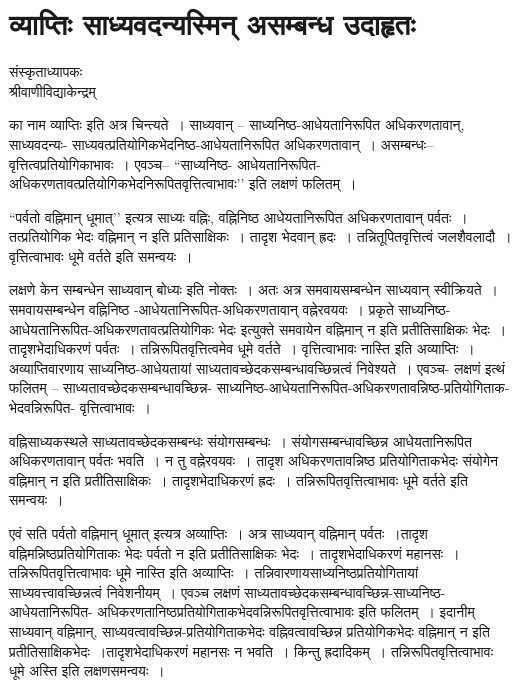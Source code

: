 {\fontsize{15}{17}\selectfont
\presetvalues
\chapter{व्याप्तिः साध्यवदन्यस्मिन्  असम्बन्ध उदाहृतः}

\begin{center}
\smallskip

संस्कृताध्यापकः\\
श्रीवाणीविद्याकेन्द्रम्
\addrule
\end{center}

का नाम व्याप्तिः इति अत्र चिन्त्यते~। साध्यवान् – साध्यनिष्ठ-आधेयतानिरूपित अधिकरणतावान्, साध्यवदन्यः- साध्यवत्प्रतियोगिकभेदनिष्ठ-आधेयतानिरूपित अधिकरणतावान्~। असम्बन्धः--वृत्तित्वप्रतियोगिकाभावः~। एवञ्च– “साध्यनिष्ठ- आधेयतानिरूपित-अधिकरणतावत्प्रतियोगिकभेदनिरूपितवृत्तित्वाभावः’’ इति लक्षणं फलितम्~। 

“पर्वतो वह्निमान् धूमात्’’ इत्यत्र साध्यः वह्निः, वह्निनिष्ठ आधेयतानिरूपित अधिकरणतावान् पर्वतः~। तत्प्रतियोगिक भेदः वह्निमान् न इति प्रतिसाक्षिकः~। तादृश भेदवान् ह्रदः~। तन्नितूपितवृत्तित्वं जलशैवलादौ~। वृत्तित्वाभावः धूमे वर्तते इति समन्वयः~। 

लक्षणे केन सम्बन्धेन साध्यवान् बोध्यः इति नोक्तः~। अतः अत्र समवायसम्बन्धेन साध्यवान् स्वीक्रियते~। समवायसम्बन्धेन वह्निनिष्ठ -आधेयतानिरूपित-अधिकरणतावान् वह्नेरवयवः~। प्रकृते साध्यनिष्ठ-आधेयतानिरूपित-अधिकरणतावत्प्रतियोगिकः भेदः इत्युक्ते समवायेन वह्निमान् न इति प्रतीतिसाक्षिकः भेदः~। तादृशभेदाधिकरणं पर्वतः~। तन्निरूपितवृत्तित्वमेव धूमे वर्तते~। वृत्तित्वाभावः नास्ति इति अव्याप्तिः~। अव्याप्तिवारणाय साध्यनिष्ठ-आधेयतायां साध्यतावच्छेदकसम्बन्धावच्छिन्नत्वं निवेश्यते~। एवञ्च- लक्षणं इत्थं फलितम् – साध्यतावच्छेदकसम्बन्धावच्छिन्न- साध्यनिष्ठ-आधेयतानिरूपित-अधिकरणतावन्निष्ठ-प्रतियोगिताक-भेदवन्निरूपित- वृत्तित्वाभावः~। 

वह्निसाध्यकस्थले साध्यतावच्छेदकसम्बन्धः संयोगसम्बन्धः~। संयोगसम्बन्धावच्छिन्न आधेयतानिरूपित अधिकरणतावान् पर्वतः भवति~। न तु वह्नेरवयवः~। तादृश अधिकरणतावन्निष्ठ प्रतियोगिताकभेदः संयोगेन वह्निमान् न इति प्रतीतिसाक्षिकः~। तादृशभेदाधिकरणं ह्रदः~। तन्निरूपितवृत्तित्वाभावः धूमे वर्तते इति समन्वयः~। 

एवं सति पर्वतो वह्निमान् धूमात् इत्यत्र अव्याप्तिः~। अत्र साध्यवान् वह्निमान् पर्वतः~।\break तादृश वह्निमन्निष्ठप्रतियोगिताकः भेदः पर्वतो न इति प्रतीतिसाक्षिकः भेदः~। तादृशभेदा\-धिकरणं महानसः~। तन्निरूपितवृत्तित्वाभावः धूमे नास्ति इति अव्याप्तिः~। तन्निवारणाय\break साध्यनिष्ठप्रतियोगितायां साध्यवत्त्वावच्छिन्नत्वं निवेशनीयम्~। एवञ्च लक्षणं साध्यतावच्छेद\-कसम्बन्धावच्छिन्न-साध्यनिष्ठ-आधेयतानिरूपित- अधिकरणतानिष्ठप्रतियोगिताकभेदवन्निरूपितवृत्तित्वाभावः इति फलितम्~। इदानीम् साध्यवान् वह्निमान्, साध्यवत्वावच्छिन्न-प्रति\-योगिताकभेदः वह्निवत्वावच्छिन्न प्रतियोगिकभेदः वह्निमान् न इति प्रतीतिसाक्षिकभेदः~।\break तादृशभेदाधिकरणं महानसः न भवति~। किन्तु ह्रदादिकम्~। तन्निरूपितवृत्तित्वाभावः धूमे अस्ति इति लक्षणसमन्वयः~। 

\articleend
}
